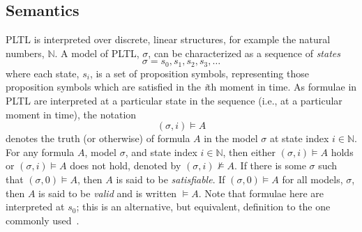 \documentclass[nohyperref]{acmtrans2f}
\newcommand{\Nat}{\mbox{\(\mathbb N\)}}
\begin{document}
\subsection{Semantics}
%
PLTL is interpreted over discrete, linear structures, for example
the natural numbers, $\Nat$. 
%
A model of PLTL, $\sigma$, can be characterized as a sequence of {\em states}
$$
 \sigma = s_{0}, s_{1}, s_{2}, s_{3}, \ldots
$$
%
where each state, $s_{i}$, is a set of proposition symbols, representing
those proposition symbols which are satisfied in the {\em i}th moment in time.
As formulae in PLTL are interpreted at a particular state in the
sequence (i.e., at a particular moment in time), the notation
%
$$
 (\sigma, i) \models  A
$$
%
denotes the truth (or otherwise) of formula $A$ in the model $\sigma$
at state index $i \in \Nat$.  For any formula $A$, model $\sigma$, and
state index $i \in \Nat$, then either $(\sigma, i) \models A$ holds or
$(\sigma, i) \models A$ does not hold, denoted by $(\sigma, i) \not
\models A$.  If there is some $\sigma$ such that $(\sigma, 0) \models
A$, then $A$ is said to be {\em satisfiable}.  If $(\sigma, 0) \models
A$ for all models, $\sigma$, then $A$ is said to be {\em valid} and is
written $\models A$. Note that formulae here are interpreted at $s_0$;
this is an alternative, but equivalent, definition to the one commonly
used~\cite{emerson:90a}.
\end{document}
